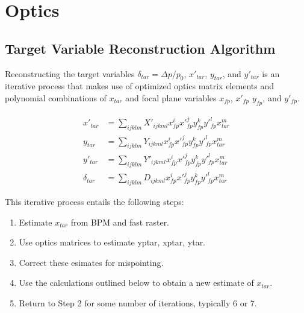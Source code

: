 \section{Optics}

\subsection{Target Variable Reconstruction Algorithm}
Reconstructing the target variables
$\delta_{tar}=\Delta p/p_0$, $x'_{tar}$, $y_{tar}$, and $y'_{tar}$
is an iterative process that makes use of optimized optics matrix elements
and polynomial combinations of $x_{tar}$ and focal plane variables
$x_{fp}$, $x'_{fp}$ $y_{fp}$, and $y'_{fp}$.

\begin{align} \label{eqn:optics_reconstruction}
    x'_{tar}     &= \sum_{ijklm} X'_{ijkml} x^i_{fp} x'^j_{fp} y^k_{fp} y'^l_{fp} x^m_{tar} \\
    y_{tar}      &= \sum_{ijklm} Y_{ijkml}  x^i_{fp} x'^j_{fp} y^k_{fp} y'^l_{fp} x^m_{tar} \\
    y'_{tar}     &= \sum_{ijklm} Y'_{ijkml} x^i_{fp} x'^j_{fp} y^k_{fp} y'^l_{fp} x^m_{tar} \\
    \delta_{tar} &= \sum_{ijklm} D_{ijkml}  x^i_{fp} x'^j_{fp} y^k_{fp} y'^l_{fp} x^m_{tar}
\end{align}

This iterative process entails the following steps:
\begin{enumerate}
    \item Estimate $x_{tar}$ from BPM and fast raster.
    \item Use optics matrices to estimate yptar, xptar, ytar.
    \item Correct these esimates for mispointing.
    \item Use the calculations outlined below to obtain a new estimate of $x_{tar}$.
    \item Return to Step 2 for some number of iterations, typically 6 or 7.
\end{enumerate}

